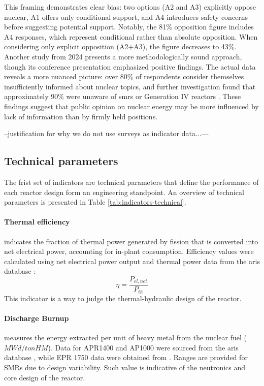 This framing demonstrates clear bias: two options (A2 and A3) explicitly oppose nuclear, A1 offers only conditional support, and A4 introduces safety concerns before suggesting potential support. Notably, the 81\% opposition figure includes A4 responses, which represent conditional rather than absolute opposition. When considering only explicit opposition (A2+A3), the figure decreases to 43\%.\\

Another study from 2024 presents a more methodologically sound approach, though its conference presentation emphasized positive findings. The actual data reveals a more nuanced picture: over 80\% of respondents consider themselves insufficiently informed about nuclear topics, and further investigation found that approximately 90\% were unaware of \glspl{smr} or Generation IV reactors \cite{SWG_Nuclear_Survey_2024}. These findings suggest that public opinion on nuclear energy may be more influenced by lack of information than by firmly held positions.

--justification for why we do not use surveys as indicator data...---

\subsection{Technical parameters}
The frist set of indicators are technical parameters that define the performance of each reactor design form an engineering standpoint.
An overview of technical parameters is presented in Table \ref{tab:indicators-technical}.
\paragraph{Thermal efficiency} indicates the fraction of thermal power generated by fission that is converted into net electrical power, accounting for in-plant consumption. Efficiency values were calculated using net electrical power output and thermal power data from the \gls{aris} database \cite{iaea2025aris}:
$$
\eta = \frac{P_{el,net}}{P_{th}}
$$
This indicator is a way to judge the thermal-hydraulic design of the reactor.

\paragraph{Discharge Burnup} measures the energy extracted per unit of heavy metal from the nuclear fuel ($MWd/tonHM$). Data for APR1400 and AP1000 were sourced from the \gls{aris} database \cite{iaea2025aris}, while EPR 1750 data were obtained from \cite{NRC_ML052280170}. Ranges are provided for SMRs due to design variability. Such value is indicative of the neutronics and core design of the reactor.

